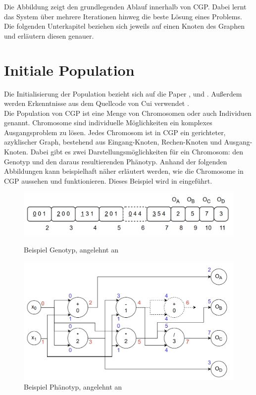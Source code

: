 Die Abbildung zeigt den grundlegenden Ablauf innerhalb von CGP.
Dabei lernt das System über mehrere Iterationen hinweg die beste Lösung eines Problems.
Die folgenden Unterkapitel beziehen sich jeweils auf einen Knoten des Graphen und erläutern diesen genauer.


\section{Initiale Population}
\label{sec:initialePopulation}
Die Initialisierung der Population bezieht sich auf die Paper \cite{miller_cartesian_2020}, \cite{torabi_using_2022} und \cite{milad_taleby_ahvanooey_survey_2019}.
Außerdem werden Erkenntnisse aus dem Quellcode von Cui verwendet \cite{cuihen_cuihencgp_with_crossover_strategies_2024}.\\

Die Population von CGP ist eine Menge von Chromosomen oder auch Individuen genannt.
Chromosome sind individuelle Möglichkeiten ein komplexes Ausgangsproblem zu lösen.
Jedes Chromosom ist in CGP ein gerichteter, azyklischer Graph, bestehend aus Eingang-Knoten, Rechen-Knoten und Ausgang-Knoten.
Dabei gibt es zwei Darstellungsmöglichkeiten für ein Chromosom: den Genotyp und den daraus resultierenden Phänotyp.
Anhand der folgenden Abbildungen kann beispielhaft näher erläutert werden, wie die Chromosome in CGP aussehen und funktionieren. Dieses Beispiel wird in \cite{torabi_using_2022} eingeführt.

\begin{figure}[H]
    \centering
    \includegraphics[scale = 0.47]{Bilder/TorabiBeispielGenotypNeu.png}
    \caption{Beispiel Genotyp, angelehnt an \cite{torabi_using_2022}}
    \label{fig:genotypNeu}
    \includegraphics[scale = 0.47]{Bilder/BeispielChromosom.png}
    \caption{Beispiel Phänotyp, angelehnt an \cite{torabi_using_2022}}
    \label{fig:phänotyp}
\end{figure}

